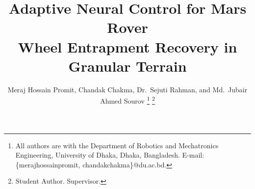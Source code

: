 \documentclass[conference]{IEEEtran}
\begin{document}
\title{Adaptive Neural Control for Mars Rover\\
       Wheel Entrapment Recovery in Granular Terrain}

\IEEEoverridecommandlockouts
\author{Meraj Hossain Promit,
        Chandak Chakma,
        Dr.~Sejuti Rahman,
        and Md.~Jubair Ahmed Sourov%
  \thanks{All authors are with the Department of Robotics and Mechatronics
          Engineering, University of Dhaka, Dhaka, Bangladesh.
          E-mail: \{merajhossainpromit, chandakchakma\}@du.ac.bd.}%
  \thanks{Student Author.\quad
          Supervisor.}%
}

\maketitle
\end{document}
